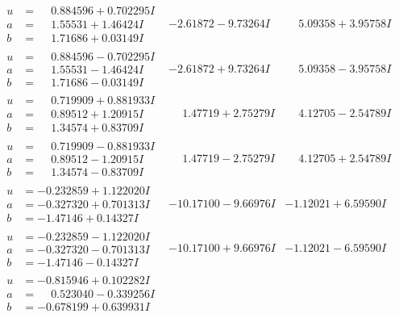 \documentclass[1p]{elsarticle_modified}
\theoremstyle{definition}
\begin{document}
$$\begin{array}{c|c|c}
\begin{aligned}
u &= \phantom{-}0.884596 + 0.702295 I \\
a &= \phantom{-}1.55531 + 1.46424 I \\
b &= \phantom{-}1.71686 + 0.03149 I\end{aligned}
 & -2.61872 - 9.73264 I & \phantom{-}5.09358 + 3.95758 I \\ \hline\begin{aligned}
u &= \phantom{-}0.884596 - 0.702295 I \\
a &= \phantom{-}1.55531 - 1.46424 I \\
b &= \phantom{-}1.71686 - 0.03149 I\end{aligned}
 & -2.61872 + 9.73264 I & \phantom{-}5.09358 - 3.95758 I \\ \hline\begin{aligned}
u &= \phantom{-}0.719909 + 0.881933 I \\
a &= \phantom{-}0.89512 + 1.20915 I \\
b &= \phantom{-}1.34574 + 0.83709 I\end{aligned}
 & \phantom{-}1.47719 + 2.75279 I & \phantom{-}4.12705 - 2.54789 I \\ \hline\begin{aligned}
u &= \phantom{-}0.719909 - 0.881933 I \\
a &= \phantom{-}0.89512 - 1.20915 I \\
b &= \phantom{-}1.34574 - 0.83709 I\end{aligned}
 & \phantom{-}1.47719 - 2.75279 I & \phantom{-}4.12705 + 2.54789 I \\ \hline\begin{aligned}
u &= -0.232859 + 1.122020 I \\
a &= -0.327320 + 0.701313 I \\
b &= -1.47146 + 0.14327 I\end{aligned}
 & -10.17100 - 9.66976 I & -1.12021 + 6.59590 I \\ \hline\begin{aligned}
u &= -0.232859 - 1.122020 I \\
a &= -0.327320 - 0.701313 I \\
b &= -1.47146 - 0.14327 I\end{aligned}
 & -10.17100 + 9.66976 I & -1.12021 - 6.59590 I \\ \hline\begin{aligned}
u &= -0.815946 + 0.102282 I \\
a &= \phantom{-}0.523040 - 0.339256 I \\
b &= -0.678199 + 0.639931 I\end{aligned}

\end{array}$$
\end{document}
